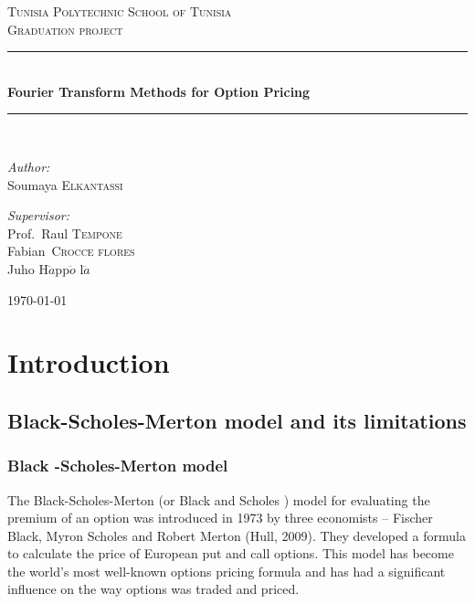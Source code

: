 \documentclass[12pt]{report}
\newcommand{\HRule}{\rule{\linewidth}{0.5mm}}
\begin{document}
\begin{titlepage}
\begin{center}
\textsc{\Large Tunisia Polytechnic School of Tunisia}\\[1.5cm]
\textsc{\Large Graduation project}\\[0.5cm]
\HRule \\[0.4cm]
{ \huge \bfseries Fourier Transform Methods for Option Pricing \\[0.4cm] }

\HRule \\[1.5cm]

\noindent
\begin{minipage}[t]{0.4\textwidth}
\begin{flushleft} \large
\emph{Author:}\\
Soumaya \textsc{Elkantassi}
\end{flushleft}
\end{minipage}%
\begin{minipage}[t]{0.6\textwidth}
\begin{flushright} \large
\emph{Supervisor:} \\
Prof.~Raul \textsc{Tempone}\\
Fabian\textsc{~Crocce flores}\\
Juho H$\ddot{a}$pp$\ddot{o}$
l$\ddot{a}
$
\end{flushright}
\end{minipage}
\vfill
{\large \today}
\end{center}
\end{titlepage}



\part{Introduction}
\chapter{Black-Scholes-Merton model and its limitations}
\section{Black -Scholes-Merton model}
The Black-Scholes-Merton (or Black and Scholes ) model for evaluating the premium of an option was introduced in 1973 by three economists – Fischer Black, Myron Scholes and Robert Merton (Hull, 2009). They developed a formula to calculate the price of European put and call options. This model has become the world's most well-known options pricing formula and has had a significant influence on the way options was traded and priced.\\
\end{document}
